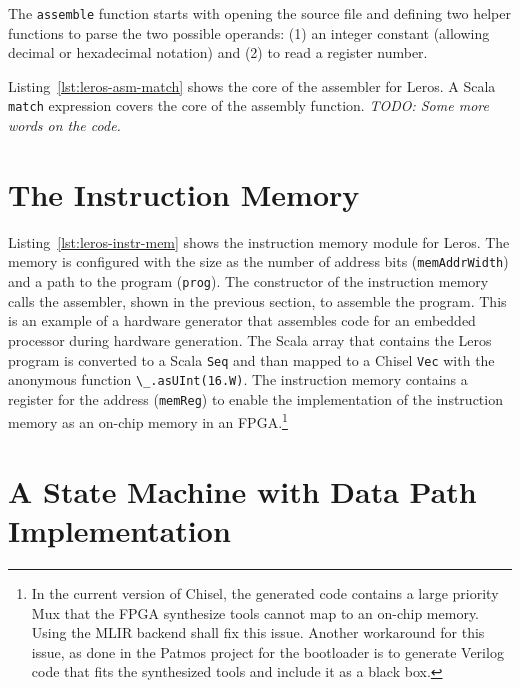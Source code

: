 \documentclass[%
    10pt,
    headinclude, footinclude=false,
    openright, %
    notitlepage,
    cleardoublepage=empty,
    headsepline,
    numbers=noenddot,
    bibliography=totoc, index=totoc,
    ]{scrbook}
\newcommand{\code}[1]{{\lstinline[basicstyle=\small\ttfamily]{#1}}}
\newcommand{\todo}[1]{{\emph{TODO: #1}}}
\begin{document}

The \code{assemble} function starts with opening the source file
and defining two helper functions to parse the two possible operands: (1) an
integer constant (allowing decimal or hexadecimal notation) and (2) to read
a register number.


Listing~\ref{lst:leros-asm-match} shows the core of the assembler for Leros.
A Scala \code{match} expression covers the core of the assembly function.
\todo{Some more words on the code.}




\section{The Instruction Memory}

Listing~\ref{lst:leros-instr-mem} shows the instruction memory module for Leros.
The memory is configured with the size as the number of address bits (\code{memAddrWidth}) and
a path to the program (\code{prog}). The constructor of the instruction memory calls the
assembler, shown in the previous section, to assemble the program.
This is an example of a hardware generator that assembles code for an
embedded processor during hardware generation.
The Scala array that contains the Leros program is converted to a Scala
\code{Seq} and than mapped to a Chisel \code{Vec} with the anonymous
function \code{\_.asUInt(16.W)}.
The instruction memory contains a register for the address (\code{memReg})
to enable the implementation of the instruction memory as an on-chip memory
in an FPGA.\footnote{In the current version of Chisel, the generated code
contains a large priority Mux that the FPGA synthesize tools cannot map to
an on-chip memory. Using the MLIR backend shall fix this issue.
Another workaround for this issue, as done in the Patmos project for the
bootloader is to generate Verilog code that fits the synthesized tools
and include it as a black box.}



\section{A State Machine with Data Path Implementation}
\end{document}
